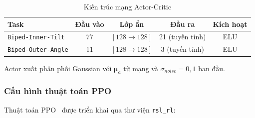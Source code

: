 \begin{table}[H]
    \centering
    \caption{Kiến trúc mạng Actor-Critic}
    \label{tab:network_arch}
    \renewcommand{\arraystretch}{1.3}
    \begin{tabular}{|l|c|c|c|c|}
    \hline
    \textbf{Task} & \textbf{Đầu vào} & \textbf{Lớp ẩn} & \textbf{Đầu ra} & \textbf{Kích hoạt} \\
    \hline
    \texttt{Biped-Inner-Tilt}  & 77 & $[128 \to 128]$ & 21 (tuyến tính) & ELU \\
    \texttt{Biped-Outer-Angle} & 11 & $[128 \to 128]$ & 3  (tuyến tính) & ELU \\
    \hline
    \end{tabular}
\end{table}

Actor xuất phân phối Gaussian với $\boldsymbol{\mu}_a$ từ mạng và
$\sigma_{noise} = 0{,}1$ ban đầu.

\subsubsection{Cấu hình thuật toán PPO}

Thuật toán PPO~\cite{schulman2017ppo} được triển khai qua thư viện
\texttt{rsl\_rl}:

